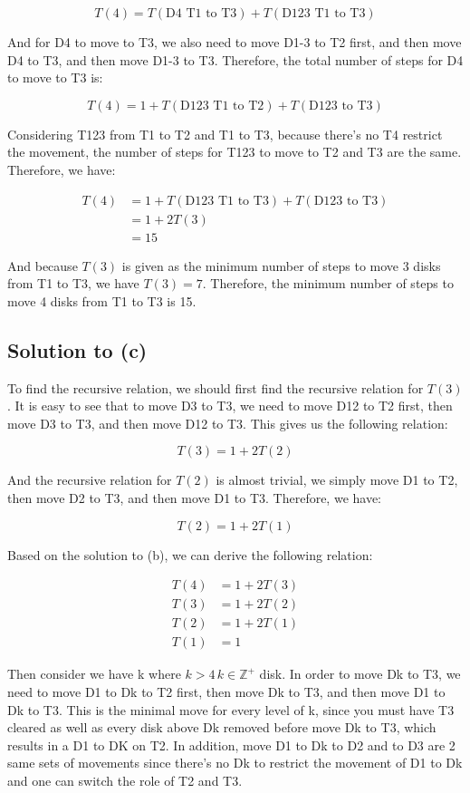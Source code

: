 \documentclass{article}
\begin{document}
\[T(4) = T(\text{D4 T1 to T3}) + T(\text{D123 T1 to T3}) \]

And for D4 to move to T3, we also need to move D1-3 to T2 first, and then move D4 to T3, and then move D1-3 to T3. Therefore, the total number of steps for D4 to move to T3 is:


\[T(4) = 1 + T(\text{D123 T1 to T2}) + T(\text{D123 to T3}) \]

Considering T123 from T1 to T2 and T1 to T3, because there's no T4 restrict the movement, the number of steps for T123 to move to T2 and T3 are the same. Therefore, we have:

\begin{align*}
T(4) &= 1 + T(\text{D123 T1 to T3}) + T(\text{D123 to T3}) \\
&= 1+ 2T(3) \\
&= 15
\end{align*}

And because \(T(3)\) is given as the minimum number of steps to move 3 disks from T1 to T3, we have \(T(3) = 7\). Therefore, the minimum number of steps to move 4 disks from T1 to T3 is 15.


\newpage

\subsection*{Solution to (c)}

To find the recursive relation, we should first find the recursive relation for \(T(3)\).
It is easy to see that to move D3 to T3, we need to move D12 to T2 first, then move D3 to T3, and then move D12 to T3. 
This gives us the following relation:

\[T(3) = 1+2T(2)\]

And the recursive relation for \(T(2)\) is almost trivial, we simply move D1 to T2, then move D2 to T3, and then move D1 to T3. Therefore, we have:

\[T(2) = 1+2T(1)\]

Based on the solution to (b), we can derive the following relation:

\begin{align*}
T(4) &= 1 + 2T(3) \\
T(3) &= 1 + 2T(2) \\
T(2) &= 1 + 2T(1) \\
T(1) &= 1
\end{align*}

Then consider we have k where \(k>4 \, k\in \mathbb{Z^+}\) disk. In order to move Dk to T3, we need to move D1 to Dk to T2 first, then move Dk to T3, and then move D1 to Dk to T3. This is the minimal move for every level of k, since you must have T3 cleared as well as every disk above Dk removed before move Dk to T3, which results in a D1 to DK on T2. In addition, move D1 to Dk to D2 and to D3 are 2 same sets of movements since there's no Dk to restrict the movement of D1 to Dk and one can switch the role of T2 and T3. 
\end{document}

